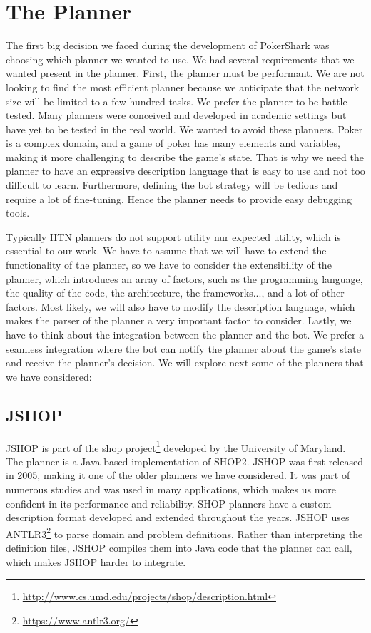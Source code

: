 
\section{The Planner}

The first big decision we faced during the development of PokerShark was choosing which planner we wanted to use. We had several requirements that we wanted present in the planner. First, the planner must be performant. We are not looking to find the most efficient planner because we anticipate that the network size will be limited to a few hundred tasks. We prefer the planner to be battle-tested. Many planners were conceived and developed in academic settings but have yet to be tested in the real world. We wanted to avoid these planners. Poker is a complex domain, and a game of poker has many elements and variables, making it more challenging to describe the game's state. That is why we need the planner to have an expressive description language that is easy to use and not too difficult to learn. Furthermore, defining the bot strategy will be tedious and require a lot of fine-tuning. Hence the planner needs to provide easy debugging tools.

Typically HTN planners do not support utility nur expected utility, which is essential to our work. We have to assume that we will have to extend the functionality of the planner, so we have to consider the extensibility of the planner, which introduces an array of factors, such as the programming language, the quality of the code, the architecture, the frameworks..., and a lot of other factors. Most likely, we will also have to modify the description language, which makes the parser of the planner a very important factor to consider. Lastly, we have to think about the integration between the planner and the bot. We prefer a seamless integration where the bot can notify the planner about the game's state and receive the planner's decision. We will explore next some of the planners that we have considered:



\subsection*{JSHOP}

JSHOP is part of the \gls{shop} project\footnote{\url{http://www.cs.umd.edu/projects/shop/description.html}} developed by the University of Maryland. The planner is a Java-based implementation of SHOP2. JSHOP was first released in 2005, making it one of the older planners we have considered. It was part of numerous studies and was used in many applications, which makes us more confident in its performance and reliability. SHOP planners have a custom description format developed and extended throughout the years. JSHOP uses ANTLR3\footnote{\url{https://www.antlr3.org/}} to parse domain and problem definitions. Rather than interpreting the definition files, JSHOP compiles them into Java code that the planner can call, which makes JSHOP harder to integrate.

